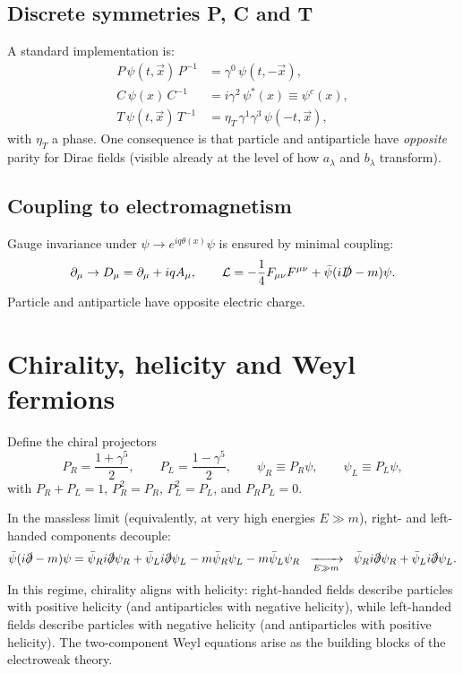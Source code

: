 \subsection{Discrete symmetries P, C and T}
A standard implementation is:
\begin{align}
P\,\psi(t,\vec x)\,P^{-1} &= \gamma^0\,\psi(t,-\vec x), \\
C\,\psi(x)\,C^{-1} &= i\gamma^2\,\psi^\ast(x)\equiv \psi^c(x), \\
T\,\psi(t,\vec x)\,T^{-1} &= \eta_T\,\gamma^1\gamma^3\,\psi(-t,\vec x),
\end{align}
with $\eta_T$ a phase. One consequence is that particle and antiparticle have \emph{opposite} parity for Dirac fields
(visible already at the level of how $a_\lambda$ and $b_\lambda$ transform).

\subsection{Coupling to electromagnetism}
Gauge invariance under $\psi\to e^{iq\theta(x)}\psi$ is ensured by minimal coupling:
\begin{equation}
\partial_\mu\to D_\mu=\partial_\mu+i q A_\mu,\qquad
\mathcal L = -\frac14 F_{\mu\nu}F^{\mu\nu}+\bar\psi(i\slashed{D}-m)\psi.
\end{equation}
Particle and antiparticle have opposite electric charge.

\section{Chirality, helicity and Weyl fermions}
Define the chiral projectors
\begin{equation}
P_R=\frac{1+\gamma^5}{2},\qquad P_L=\frac{1-\gamma^5}{2},\qquad
\psi_R\equiv P_R\psi,\qquad \psi_L\equiv P_L\psi,
\end{equation}
with $P_R+P_L=1$, $P_R^2=P_R$, $P_L^2=P_L$, and $P_RP_L=0$.

In the massless limit (equivalently, at very high energies $E\gg m$), right- and left-handed components decouple:
\begin{equation}
\bar\psi(i\slashed{\partial}-m)\psi
= \bar\psi_R i\slashed{\partial}\psi_R+\bar\psi_L i\slashed{\partial}\psi_L
- m\bar\psi_R\psi_L - m\bar\psi_L\psi_R
\;\;\xrightarrow[E\gg m]{}\;\;
\bar\psi_R i\slashed{\partial}\psi_R+\bar\psi_L i\slashed{\partial}\psi_L.
\end{equation}
In this regime, chirality aligns with helicity: right-handed fields describe particles with positive helicity
(and antiparticles with negative helicity), while left-handed fields describe particles with negative helicity
(and antiparticles with positive helicity). The two-component Weyl equations arise as the building blocks of the electroweak theory.

